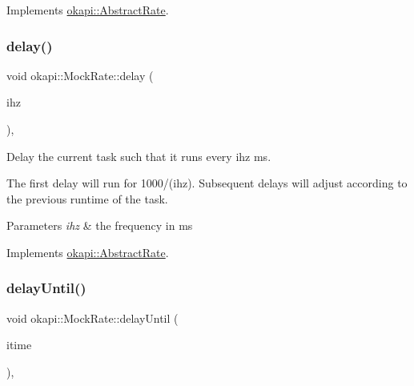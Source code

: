 Implements \mbox{\hyperlink{classokapi_1_1AbstractRate_ab1abf71d6cf3184abeed1d3556d39d4f}{okapi\+::\+Abstract\+Rate}}.

\mbox{\label{classokapi_1_1MockRate_acd0e61858825a78f84610d50f0a4bc10}} 
\subsubsection{\texorpdfstring{delay()}{delay()}\hspace{0.1cm}{\footnotesize\ttfamily [2/2]}}
{\footnotesize\ttfamily void okapi\+::\+Mock\+Rate\+::delay (\begin{DoxyParamCaption}\item[{int}]{ihz }\end{DoxyParamCaption})\hspace{0.3cm}{\ttfamily [override]}, {\ttfamily [virtual]}}



Delay the current task such that it runs every ihz ms. 

The first delay will run for 1000/(ihz). Subsequent delays will adjust according to the previous runtime of the task.


\begin{DoxyParams}{Parameters}
{\em ihz} & the frequency in ms \\
\hline
\end{DoxyParams}


Implements \mbox{\hyperlink{classokapi_1_1AbstractRate_a89a4325d3fc4739abc085813095d659a}{okapi\+::\+Abstract\+Rate}}.

\mbox{\label{classokapi_1_1MockRate_a561ecf619b53825d78d7ca0d9d95640b}} 
\subsubsection{\texorpdfstring{delayUntil()}{delayUntil()}\hspace{0.1cm}{\footnotesize\ttfamily [1/2]}}
{\footnotesize\ttfamily void okapi\+::\+Mock\+Rate\+::delay\+Until (\begin{DoxyParamCaption}\item[{Q\+Time}]{itime }\end{DoxyParamCaption})\hspace{0.3cm}{\ttfamily [override]}, {\ttfamily [virtual]}}



